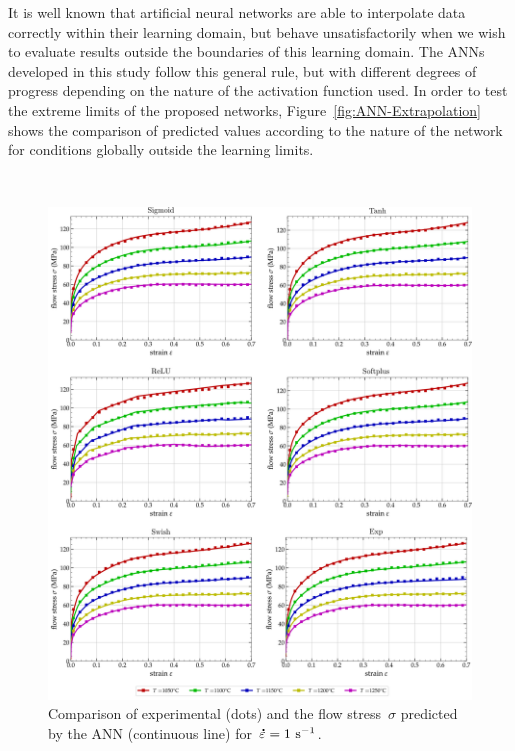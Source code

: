 \documentclass[algorithms,article,accept,pdftex,oneauthor]{Definitions/mdpi}
\DeclareRobustCommand{\mdot}[1]{\accentset{\mbox{\bfseries .}}{#1}}
\DeclareRobustCommand{\ps}{\text{s}^{-1}}
\begin{document}
It is well known that artificial neural networks are able to interpolate data correctly within their learning domain, but behave unsatisfactorily when we wish to evaluate results outside the boundaries of this learning domain.
The ANNs developed in this study follow this general rule, but with different degrees of progress depending on the nature of the activation function used.
In order to test the extreme limits of the proposed networks, Figure~\ref{fig:ANN-Extrapolation} shows the comparison of predicted values according to the nature of the network for conditions globally outside the learning limits.
\begin{figure}[H]
\

\includegraphics[width=0.97\columnwidth]{Figures/ANN-fit}
\caption{Comparison of experimental (dots) and the flow stress~$\sigma$ predicted by the ANN (continuous line) for~$\mdot{\varepsilon}=1~\ps$.}
\label{fig:ANNFit}
\end{figure}
\end{document}
